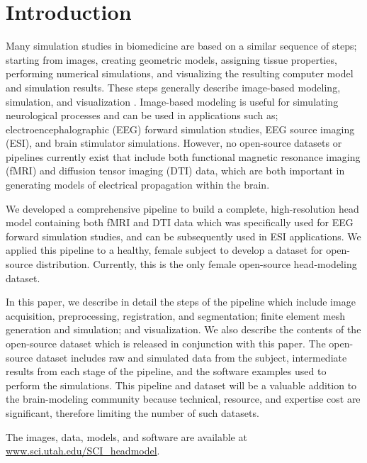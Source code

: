 
\section{Introduction}
\label{sec:intro}

Many simulation studies in biomedicine are based on a similar sequence of steps; starting from images, creating geometric models, assigning tissue properties, performing numerical simulations, and visualizing the resulting computer model and simulation results. These steps generally describe image-based modeling, simulation, and visualization \cite{SCI:Mac2009a,SCI:Joh2015c,SCI:Joh2012a,SCI:Joh2006a,SCI:Joh2004b}. Image-based modeling is useful for simulating neurological processes and can be used in applications such as; electroencephalographic (EEG) forward simulation studies, EEG source imaging (ESI), and brain stimulator simulations. However, no open-source datasets or pipelines currently exist that include both functional magnetic resonance imaging (fMRI) and diffusion tensor imaging (DTI) data, which are both important in generating models of electrical propagation within the brain. 

We developed a comprehensive pipeline to build a complete, high-resolution head model containing both fMRI and DTI data which was specifically used for EEG forward simulation studies, and can be subsequently used in ESI applications. We applied this pipeline to a healthy, female subject to develop a dataset for open-source distribution. Currently, this is the only female open-source head-modeling dataset.

In this paper, we describe in detail the steps of the pipeline which include image acquisition, preprocessing, registration, and segmentation; finite element mesh generation and simulation; and visualization. We also describe the contents of the open-source dataset which is released in conjunction with this paper. The open-source dataset includes raw and simulated data from the subject, intermediate results from each stage of the pipeline, and the software examples used to perform the simulations. This pipeline and dataset will be a valuable addition to the brain-modeling community because technical, resource, and expertise cost are significant, therefore limiting the number of such datasets. 

The images, data, models, and software are available at \url{www.sci.utah.edu/SCI_headmodel}.